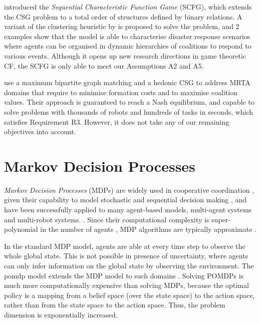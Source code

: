 \cite{krausburg2021} introduced the \emph{Sequential Characteristic Function Game} (SCFG),
which extends the CSG problem to a total order of structures defined by binary relations.
A variant of the clustering heuristic by \cite{farinelli2017} is proposed to solve the
problem, and $2$ examples show that the model is able to characterise disaster response
scenarios where agents can be organised in dynamic hierarchies of coalitions to respond to
various events. Although it opens up new research directions in game theoretic CF, the
SCFG is only able to meet our Assumptions A2 and A5.

\cite{czarnecki2021} use a maximum bipartite graph matching and a hedonic CSG
\cite{bogomolnaia2002} to address MRTA domains that require to minimise formation costs
and to maximise coalition values. Their approach is guaranteed to reach a Nash
equilibrium, and capable to solve problems with thousands of robots and hundreds of tasks
in seconds, which satisfies Requirement R3. However, it does not take any of our remaining
objectives into account.

\section{Markov Decision Processes}\label{sec:mdp}

\emph{Markov Decision Processes} (MDPs) \cite{seuken2008} are widely used in cooperative
coordination \cite{torreno2017}, given their capability to model stochastic and sequential
decision making \cite{sutton1998,diederich2001,kolobov2012}, and have been successfully
applied to many agent-based models, multi-agent systems and multi-robot systems.
\cite{smith1981,stone2005,guestrin2002,denijs2021,kurniawati2021survey}.
Since their computational complexity is super-polynomial in the number of agents
\cite{bellman2003}, MDP algorithms are typically approximate
\cite{sutton1996,bertsekas2012,mahadevan2007,busoniu2017,geramifard2011}.

In the standard MDP model, agents are able at every time step to observe the whole global
state. This is not possible in presence of uncertainty, where agents can only infer
information on the global state by observing the environment. The \gls{pomdp} model
extends the MDP model to such domains \cite{seuken2008}. Solving POMDPs is much more
computationally expensive than solving MDPs, because the optimal policy is a mapping from
a belief space (over the state space) to the action space, rather than from the state
space to the action space. Thus, the problem dimension is exponentially increased.

